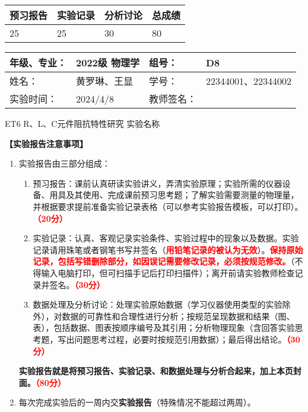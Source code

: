 \documentclass[dvipsnames, svgnames,a4paper,11pt]{article}
\begin{document}
	
	\begin{table}
		\renewcommand\arraystretch{1.7}
		\begin{tabularx}{\textwidth}{
				|X|X|X|X
				|X|X|X|X|}
			\hline
			\multicolumn{2}{|c|}{预习报告}&\multicolumn{2}{|c|}{实验记录}&\multicolumn{2}{|c|}{分析讨论}&\multicolumn{2}{|c|}{总成绩}\\
			\hline
			\LARGE25 & & \LARGE25 & & \LARGE30 & & \LARGE80 & \\
			\hline
		\end{tabularx}
	\end{table}
	
	\begin{table}
		\renewcommand\arraystretch{1.7}
		\begin{tabularx}{\textwidth}{|X|X|X|X|}
			\hline
			年级、专业： & 2022级 物理学 &组号： &D8 \\
			\hline
			姓名： & 黄罗琳、王显   & 学号： &  22344001、22344002 \\
			\hline
			实验时间： & 2024/4/8 & 教师签名： & \\
			\hline
		\end{tabularx}
	\end{table}
	
	\begin{center}
		\LARGE ET6 R、L、C元件阻抗特性研究 \quad 实验名称
	\end{center}
	
	
	\textbf{【实验报告注意事项】}
	\begin{enumerate}
		\item 实验报告由三部分组成：
		\begin{enumerate}
			\item 预习报告：课前认真研读实验讲义，弄清实验原理；实验所需的仪器设备、用具及其使用、完成课前预习思考题；了解实验需要测量的物理量，并根据要求提前准备实验记录表格（可以参考实验报告模板，可以打印）。\textcolor{red}{\textbf{（20分）}}
			\item 实验记录：认真、客观记录实验条件、实验过程中的现象以及数据。实验记录请用珠笔或者钢笔书写并签名（\textcolor{red}{\textbf{用铅笔记录的被认为无效}}）。\textcolor{red}{\textbf{保持原始记录，包括写错删除部分，如因误记需要修改记录，必须按规范修改。}}（不得输入电脑打印，但可扫描手记后打印扫描件）；离开前请实验教师检查记录并签名。\textcolor{red}{\textbf{（30分）}}
			\item 数据处理及分析讨论：处理实验原始数据（学习仪器使用类型的实验除外），对数据的可靠性和合理性进行分析；按规范呈现数据和结果（图、表），包括数据、图表按顺序编号及其引用；分析物理现象（含回答实验思考题，写出问题思考过程，必要时按规范引用数据）；最后得出结论。\textcolor{red}{\textbf{（30分）}}
		\end{enumerate}
		\textbf{实验报告就是将预习报告、实验记录、和数据处理与分析合起来，加上本页封面。\textcolor{red}{（80分）}}
		\item 每次完成实验后的一周内交\textbf{实验报告}（特殊情况不能超过两周）。
	\end{enumerate}
		
\end{document}
